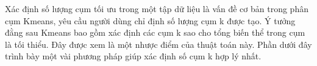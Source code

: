 Xác định số lượng cụm tối ưu trong một tập dữ liệu là vấn đề cơ bản trong phân cụm Kmeans, yêu cầu người dùng chỉ định số lượng cụm k được tạo. Ý tưởng đằng sau Kmeans bao gồm xác định các cụm k sao cho tổng biến thể trong cụm là tối thiểu. Đây được xem là một nhược điểm của thuật toán này. Phần dưới đây trình bày một vài phương pháp giúp xác định số cụm k hợp lý nhất.